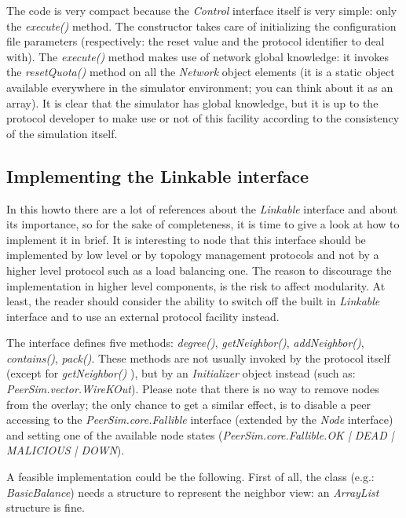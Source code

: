 \documentclass[a4paper,11pt]{article}
\begin{document}
The code is very compact because the \emph{Control} interface itself
is very simple: only the \emph{execute()} method. The constructor takes
care of initializing the configuration file parameters (respectively:
the reset value and the protocol identifier to deal with). The \emph{execute()}
method makes use of network global knowledge: it invokes the \emph{resetQuota()}
method on all the \emph{Network} object elements (it is a static
object available everywhere in the simulator environment; you can think
about it as an array). It is clear that the simulator has global knowledge,
but it is up to the protocol developer to make use or not of this
facility according to the consistency of the simulation itself. 


\subsection{Implementing the Linkable interface}

In this howto there are a lot of references about the \emph{Linkable}
interface and about its importance, so for the sake of completeness,
it is time to give a look at how to implement it in brief. It is interesting
to node that this interface should be implemented by low level or
by topology management protocols and not by a higher level protocol
such as a load balancing one. The reason to discourage the
implementation in higher level components,
is the risk to affect modularity. At least, the reader should consider
the ability to switch off the built in \emph{Linkable} interface and
to use an external protocol facility instead.

The interface defines five methods: \emph{degree()}, \emph{getNeighbor()},
\emph{addNeighbor()}, \emph{contains()}, \emph{pack()}. These methods
are not usually invoked by the protocol itself (except for \emph{getNeighbor()}
), but by an \emph{Initializer} object instead (such as: 
\emph{PeerSim.vector.WireKOut}).
Please note that there
is no way to remove nodes from the overlay; the only chance to get
a similar effect, is to disable a peer accessing to the \emph{PeerSim.core.Fallible}
interface (extended by the \emph{Node} interface) and setting one
of the available node states (\emph{PeerSim.core.Fallible.OK | DEAD | 
MALICIOUS | DOWN}). 

A feasible implementation could be the following. First of all, the
class (e.g.: \emph{BasicBalance}) needs a structure to represent the
neighbor view: an \emph{ArrayList} structure is fine.
\end{document}
